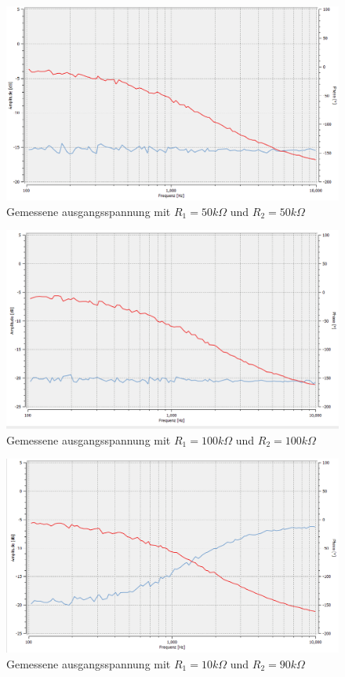 \begin{figure}[htb]
    \includegraphics[width=16cm]{./pictures/Messungen/Gesamtschaltung_Test_50_50}
    \caption{Gemessene ausgangsspannung mit $R_1 = 50k\Omega$ und $R_2 = 50k\Omega$}
    \label{fig:Gesamtschaltung_Test_50_50}
\end{figure}

\newpage
\begin{figure}[htb]
    \includegraphics[width=16cm]{./pictures/Messungen/Gesamtschaltung_Test_100_100}
    \caption{Gemessene ausgangsspannung mit $R_1 = 100k\Omega$ und $R_2 = 100k\Omega$}
    \label{fig:Gesamtschaltung_Test_100_100}
\end{figure}

\begin{figure}[htb]
    \includegraphics[width=16cm]{./pictures/Messungen/Gesamtschaltung_Test_10_90}
    \caption{Gemessene ausgangsspannung mit $R_1 = 10k\Omega$ und $R_2 = 90k\Omega$}
    \label{fig:Gesamtschaltung_Test_10_90}
\end{figure}

